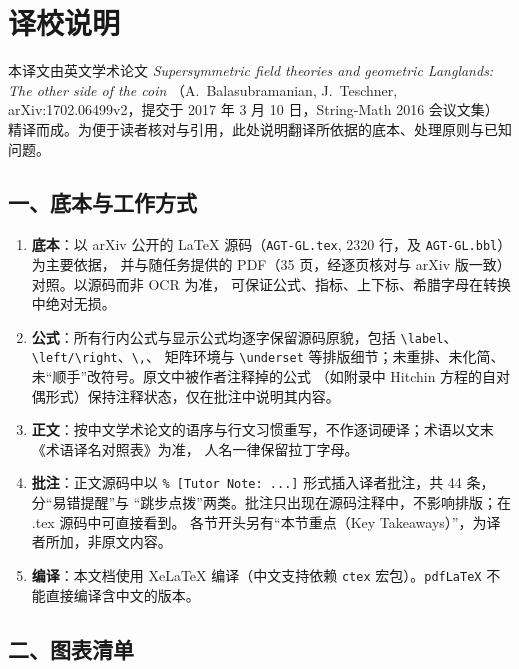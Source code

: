 \section*{译校说明}

本译文由英文学术论文 \emph{Supersymmetric field theories and geometric Langlands: The other side of the coin}
（A.~Balasubramanian, J.~Teschner, arXiv:1702.06499v2，提交于 2017 年 3 月 10 日，String-Math 2016 会议文集）
精译而成。为便于读者核对与引用，此处说明翻译所依据的底本、处理原则与已知问题。

\subsection*{一、底本与工作方式}

\begin{enumerate}[label=（\arabic*）,leftmargin=*]
  \item \textbf{底本}：以 arXiv 公开的 \LaTeX{} 源码（\texttt{AGT-GL.tex}, 2320 行，及 \texttt{AGT-GL.bbl}）为主要依据，
        并与随任务提供的 PDF（35 页，经逐页核对与 arXiv 版一致）对照。以源码而非 OCR 为准，
        可保证公式、指标、上下标、希腊字母在转换中绝对无损。
  \item \textbf{公式}：所有行内公式与显示公式均逐字保留源码原貌，包括 \verb|\label|、\verb|\left/\right|、\verb|\,|、
        矩阵环境与 \verb|\underset| 等排版细节；未重排、未化简、未“顺手”改符号。原文中被作者注释掉的公式
        （如附录中 Hitchin 方程的自对偶形式）保持注释状态，仅在批注中说明其内容。
  \item \textbf{正文}：按中文学术论文的语序与行文习惯重写，不作逐词硬译；术语以文末《术语译名对照表》为准，
        人名一律保留拉丁字母。
  \item \textbf{批注}：正文源码中以 \verb|% [Tutor Note: ...]| 形式插入译者批注，共 44 条，分“易错提醒”与
        “跳步点拨”两类。批注只出现在源码注释中，不影响排版；在 .tex 源码中可直接看到。
        各节开头另有“本节重点（Key Takeaways）”，为译者所加，非原文内容。
  \item \textbf{编译}：本文档使用 XeLaTeX 编译（中文支持依赖 \texttt{ctex} 宏包）。\texttt{pdfLaTeX} 不能直接编译含中文的版本。
\end{enumerate}

\subsection*{二、图表清单}

